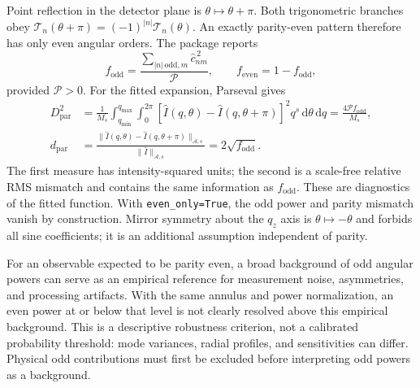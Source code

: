 \documentclass[aps,prb,preprint,onecolumn,notitlepage,amsmath,amssymb,
  superscriptaddress,floatfix]{revtex4-2}
\newcommand{\dd}{\,\mathrm{d}}
\newcommand{\Ann}{\mathcal{A}}
\begin{document}
Point reflection in the detector plane is $\theta\mapsto\theta+\pi$.
Both trigonometric branches obey
$\mathcal{T}_n(\theta+\pi)=(-1)^{|n|}\mathcal{T}_n(\theta)$.
An exactly parity-even pattern therefore has only even angular orders.
The package reports
\begin{equation}
 f_{\mathrm{odd}}=
 \frac{\sum_{|n|\,\mathrm{odd},m}\widehat c_{nm}^{\,2}}{\mathcal{P}},
 \qquad f_{\mathrm{even}}=1-f_{\mathrm{odd}},
 \label{eq:parity-fractions}
\end{equation}
provided $\mathcal{P}>0$. For the fitted expansion, Parseval gives
\begin{align}
 D_{\mathrm{par}}^2
 &=\frac{1}{M_s}\int_{q_{\min}}^{q_{\max}}\int_0^{2\pi}
 [\widehat I(q,\theta)-\widehat I(q,\theta+\pi)]^2
 q^s\dd\theta\dd q
 =\frac{4\mathcal{P}f_{\mathrm{odd}}}{M_s},
 \label{eq:parity-mismatch}\\
 d_{\mathrm{par}}
 &=\frac{\|\widehat I(q,\theta)-\widehat I(q,\theta+\pi)\|_{\Ann,s}}
          {\|\widehat I\|_{\Ann,s}}
 =2\sqrt{f_{\mathrm{odd}}}.
 \label{eq:relative-parity}
\end{align}
The first measure has intensity-squared units; the second is a scale-free
relative RMS mismatch and contains the same information as $f_{\mathrm{odd}}$.
These are diagnostics of the fitted function. With \texttt{even\_only=True},
the odd power and parity mismatch vanish by construction. Mirror symmetry
about the $q_z$ axis is $\theta\mapsto-\theta$ and forbids all sine coefficients;
it is an additional assumption independent of parity.

For an observable expected to be parity even, a broad background of odd
angular powers can serve as an empirical reference for measurement noise,
asymmetries, and processing artifacts. With the same annulus and power
normalization, an even power at or below that level is not clearly
resolved above this empirical background. This is a descriptive robustness
criterion, not a calibrated probability threshold: mode variances, radial
profiles, and sensitivities can differ. Physical odd contributions must
first be excluded before interpreting odd powers as a background.
\end{document}
